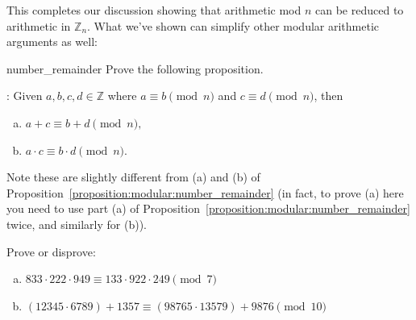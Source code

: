 This completes our discussion showing that arithmetic mod $n$ can be reduced to arithmetic in ${\mathbb Z}_n$.  What we've shown can simplify other modular arithmetic arguments as well:

\begin{exercise}{number_remainder}
Prove the following proposition.

: Given $a,b,c,d \in {\mathbb Z}$ where $a \equiv b \pmod{n}$ and $c \equiv d \pmod{n}$, then 

\begin{enumerate}[(a)]
\item
$a + c \equiv b + d \pmod{n},$ 
\item
$a \cdot c \equiv b \cdot d \pmod{n}$.
\end{enumerate}

Note these are slightly different from (a) and (b) of  Proposition~\ref{proposition:modular:number_remainder} (in fact, to prove (a) here you need to use  part (a) of   Proposition~\ref{proposition:modular:number_remainder} twice, and similarly for (b)).
\end{exercise}

\begin{exercise}{}
Prove or disprove:
\begin{enumerate}[(a)]
\item
$833 \cdot 222 \cdot 949 \equiv 133 \cdot  922 \cdot 249 \pmod{7}$
\item
$(12345 \cdot 6789) + 1357 \equiv (98765 \cdot 13579) + 9876 \pmod{10}$
\end{enumerate}
\end{exercise}


